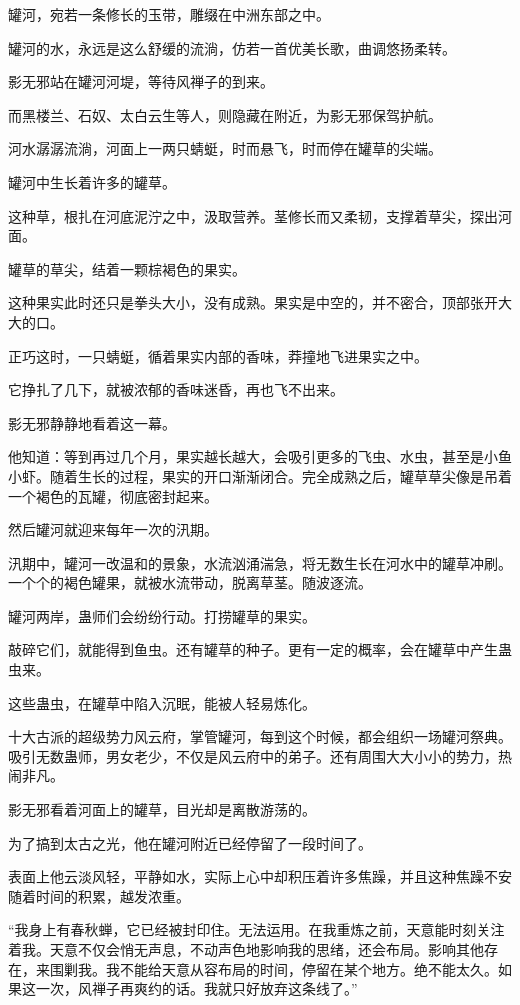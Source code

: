 
\begin{this_body}

罐河，宛若一条修长的玉带，雕缀在中洲东部之中。

罐河的水，永远是这么舒缓的流淌，仿若一首优美长歌，曲调悠扬柔转。

影无邪站在罐河河堤，等待风禅子的到来。

而黑楼兰、石奴、太白云生等人，则隐藏在附近，为影无邪保驾护航。

河水潺潺流淌，河面上一两只蜻蜓，时而悬飞，时而停在罐草的尖端。

罐河中生长着许多的罐草。

这种草，根扎在河底泥泞之中，汲取营养。茎修长而又柔韧，支撑着草尖，探出河面。

罐草的草尖，结着一颗棕褐色的果实。

这种果实此时还只是拳头大小，没有成熟。果实是中空的，并不密合，顶部张开大大的口。

正巧这时，一只蜻蜓，循着果实内部的香味，莽撞地飞进果实之中。

它挣扎了几下，就被浓郁的香味迷昏，再也飞不出来。

影无邪静静地看着这一幕。

他知道：等到再过几个月，果实越长越大，会吸引更多的飞虫、水虫，甚至是小鱼小虾。随着生长的过程，果实的开口渐渐闭合。完全成熟之后，罐草草尖像是吊着一个褐色的瓦罐，彻底密封起来。

然后罐河就迎来每年一次的汛期。

汛期中，罐河一改温和的景象，水流汹涌湍急，将无数生长在河水中的罐草冲刷。一个个的褐色罐果，就被水流带动，脱离草茎。随波逐流。

罐河两岸，蛊师们会纷纷行动。打捞罐草的果实。

敲碎它们，就能得到鱼虫。还有罐草的种子。更有一定的概率，会在罐草中产生蛊虫来。

这些蛊虫，在罐草中陷入沉眠，能被人轻易炼化。

十大古派的超级势力风云府，掌管罐河，每到这个时候，都会组织一场罐河祭典。吸引无数蛊师，男女老少，不仅是风云府中的弟子。还有周围大大小小的势力，热闹非凡。

影无邪看着河面上的罐草，目光却是离散游荡的。

为了搞到太古之光，他在罐河附近已经停留了一段时间了。

表面上他云淡风轻，平静如水，实际上心中却积压着许多焦躁，并且这种焦躁不安随着时间的积累，越发浓重。

“我身上有春秋蝉，它已经被封印住。无法运用。在我重炼之前，天意能时刻关注着我。天意不仅会悄无声息，不动声色地影响我的思绪，还会布局。影响其他存在，来围剿我。我不能给天意从容布局的时间，停留在某个地方。绝不能太久。如果这一次，风禅子再爽约的话。我就只好放弃这条线了。”


\end{this_body}
